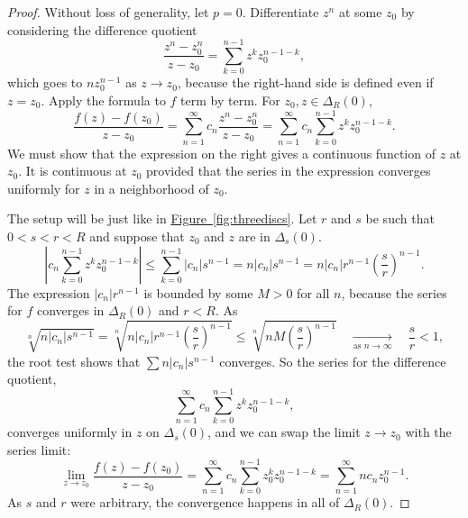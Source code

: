 \documentclass[12pt,openany]{book}
\newcommand{\sabs}[1]{\lvert {#1} \rvert}
\newcommand{\abs}[1]{\left\lvert {#1} \right\rvert}
\theoremstyle{plain}
\theoremstyle{remark}
\theoremstyle{definition}
\theoremstyle{exercise}
\theoremstyle{example}
\newcommand{\figureref}[1]{\hyperref[#1]{Figure~\ref*{#1}}}
\begin{document}
\begin{proof}
Without loss of generality, let $p=0$.
Differentiate $z^n$ at some $z_0$ by considering the difference
quotient
\begin{equation*}
\frac{z^n-z_0^n}{z-z_0}
=
\sum_{k=0}^{n-1}
z^k z_0^{n-1-k} ,
\end{equation*}
which goes to $n z_0^{n-1}$ as $z \to z_0$, because
the right-hand side is defined even if $z = z_0$.
Apply the formula to $f$
term by term.  For $z_0,z \in \Delta_R(0)$,
\begin{equation*}
\frac{f(z) - f(z_0)}{z-z_0}
=
\sum_{n=1}^\infty c_n \frac{z^n-z_0^n}{z-z_0}
=
\sum_{n=1}^\infty c_n \sum_{k=0}^{n-1} z^k z_0^{n-1-k} .
\end{equation*}
We must show that the expression on the right gives a continuous function of $z$
at $z_0$.
It is continuous at $z_0$ provided that the series
in the expression converges uniformly for $z$ in a
neighborhood of $z_0$.

The setup will be just like in \figureref{fig:threediscs}.
Let $r$ and $s$ be such that $0 < s < r < R$ and suppose that $z_0$ and $z$ are
in $\Delta_s(0)$.
\begin{equation*}
\abs{c_n \sum_{k=0}^{n-1} z^k z_0^{n-1-k}}
\leq
\sum_{k=0}^{n-1} 
\sabs{c_n}
s^{n-1}
=
n
\sabs{c_n} s^{n-1}
=
n
\sabs{c_n} r^{n-1} {\left(\frac{s}{r}\right)}^{n-1} .
\end{equation*}
The expression
$\sabs{c_n} r^{n-1}$ is bounded by some $M > 0$ for all $n$,
because the series for $f$ converges
in $\Delta_R(0)$ and $r < R$.
As
\begin{equation*}
\sqrt[n]{
n \sabs{c_n} s^{n-1}
}
=
\sqrt[n]{
n \sabs{c_n} r^{n-1} {\left(\frac{s}{r}\right)}^{n-1}
}
\leq
\sqrt[n]{
n M {\left(\frac{s}{r}\right)}^{n-1}
}
\quad\underset{\text{as } n \to \infty}{\to}\quad
\frac{s}{r} < 1 ,
\end{equation*}
the root test shows that
$\sum n \sabs{c_n} s^{n-1}$
converges.
So the series for the difference quotient,
\begin{equation*}
\sum_{n=1}^\infty c_n \sum_{k=0}^{n-1} z^k z_0^{n-1-k} ,
\end{equation*}
converges uniformly in $z$ on $\Delta_s(0)$, and
we can swap the limit $z \to z_0$ with the series limit:
\begin{equation*}
\lim_{z \to z_0}
\frac{f(z)-f(z_0)}{z-z_0}
=
\sum_{n=1}^\infty c_n \sum_{k=0}^{n-1} z_0^k z_0^{n-1-k}
=
\sum_{n=1}^\infty n c_n z_0^{n-1} .
\end{equation*}
As $s$ and $r$ were arbitrary, the convergence happens in all of
$\Delta_R(0)$.
\end{proof}
\end{document}
